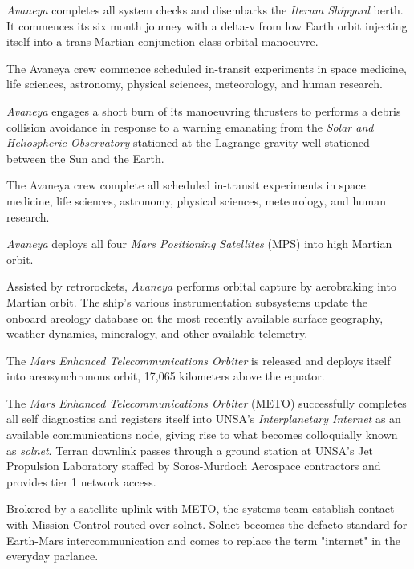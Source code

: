 {\it Avaneya} completes all system checks and disembarks the {\it Iterum Shipyard} berth. It commences its six month journey with a delta-v from low Earth orbit injecting itself into a trans-Martian conjunction class orbital manoeuvre.
\StopTimelineDate

The Avaneya crew commence scheduled in-transit experiments in space medicine, life sciences, astronomy, physical sciences, meteorology, and human research.
\StopTimelineDate

{\it Avaneya} engages a short burn of its manoeuvring thrusters to performs a debris collision avoidance in response to a warning emanating from the {\it Solar and Heliospheric Observatory} stationed at the Lagrange  gravity well stationed between the Sun and the Earth.
\StopTimelineDate

The Avaneya crew complete all scheduled in-transit experiments in space medicine, life sciences, astronomy, physical sciences, meteorology, and human research.
\StopTimelineDate

{\it Avaneya} deploys all four {\it Mars Positioning Satellites} (MPS) into high Martian orbit.
\StopTimelineDate

Assisted by retrorockets, {\it Avaneya} performs orbital capture by aerobraking into Martian orbit. The ship's various instrumentation subsystems update the onboard areology database on the most recently available surface geography, weather dynamics, mineralogy, and other available telemetry.

The {\it Mars Enhanced Telecommunications Orbiter} is released and deploys itself into areosynchronous orbit, 17,065 kilometers above the equator.

The {\it Mars Enhanced Telecommunications Orbiter} (METO) successfully completes all self diagnostics and registers itself into UNSA's {\it Interplanetary Internet} as an available communications node, giving rise to what becomes colloquially known as {\it solnet}. Terran downlink passes through a ground station at UNSA's Jet Propulsion Laboratory staffed by Soros-Murdoch Aerospace contractors and provides tier 1 network access.

Brokered by a satellite uplink with METO, the systems team establish contact with Mission Control routed over solnet. Solnet becomes the defacto standard for Earth-Mars intercommunication and comes to replace the term "internet" in the everyday parlance.
\StopTimelineDate

